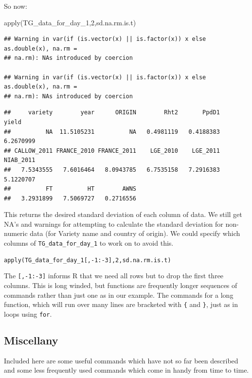 \documentclass[
]{book}
\newenvironment{Shaded}{\begin{snugshade}}{\end{snugshade}}
\newcommand{\DecValTok}[1]{\textcolor[rgb]{0.00,0.00,0.81}{#1}}
\newcommand{\FunctionTok}[1]{\textcolor[rgb]{0.00,0.00,0.00}{#1}}
\newcommand{\NormalTok}[1]{#1}
\begin{document}
So now:

\begin{Shaded}
\begin{Highlighting}[]
\FunctionTok{apply}\NormalTok{(TG\_data\_for\_day\_1,}\DecValTok{2}\NormalTok{,sd.na.rm.is.t)}
\end{Highlighting}
\end{Shaded}

\begin{verbatim}
## Warning in var(if (is.vector(x) || is.factor(x)) x else as.double(x), na.rm =
## na.rm): NAs introduced by coercion

## Warning in var(if (is.vector(x) || is.factor(x)) x else as.double(x), na.rm =
## na.rm): NAs introduced by coercion
\end{verbatim}

\begin{verbatim}
##     variety        year      ORIGIN        Rht2       PpdD1       yield 
##          NA  11.5105231          NA   0.4981119   0.4188383   6.2670999 
## CALLOW_2011 FRANCE_2010 FRANCE_2011    LGE_2010    LGE_2011   NIAB_2011 
##   7.5343555   7.6016464   8.0943785   6.7535158   7.2916383   5.1220707 
##          FT          HT        AWNS 
##   3.2931899   7.5069727   0.2716556
\end{verbatim}

This returns the desired standard deviation of each column of data. We still get NA's and warnings for attempting to calculate the standard deviation for non-numeric data (for Variety name and country of origin). We could specify which columns of \texttt{TG\_data\_for\_day\_1} to work on to avoid this.

\texttt{apply(TG\_data\_for\_day\_1{[},-1:-3{]},2,sd.na.rm.is.t)}

The \texttt{{[},-1:-3{]}} informs R that we need all rows but to drop the first three columns.
This is long winded, but functions are frequently longer sequences of commands rather than just one as in our example. The commands for a long function, which will run over many lines are bracketed with \texttt{\{} and \texttt{\}}, just as in loops using \texttt{for}.

\hypertarget{miscellany}{%
\subsection{Miscellany}\label{miscellany}}

Included here are some useful commands which have not so far been described and some less frequently used commands which come in handy from time to time.
\end{document}

